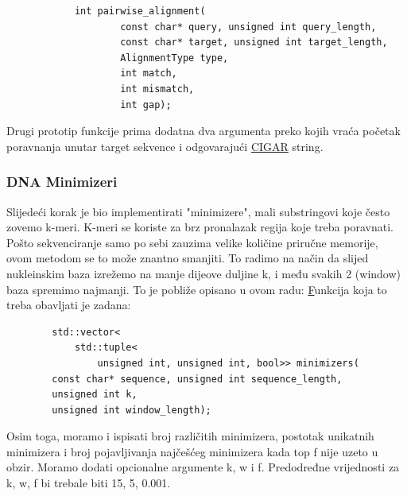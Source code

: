 \documentclass[times, 12pt, utf8]{article}
\begin{document}
            \begin{lstlisting}
            int pairwise_alignment(
                    const char* query, unsigned int query_length,
                    const char* target, unsigned int target_length, 
                    AlignmentType type,
                    int match,
                    int mismatch,
                    int gap);
            \end{lstlisting}

            Drugi prototip funkcije prima dodatna dva argumenta preko kojih
            vraća početak poravnanja unutar \colorbox{gray!30}{target}
            sekvence i odgovarajući \href {https://samtools.github.io/hts-specs/SAMv1.pdf}{CIGAR} string.

        \subsubsection{DNA Minimizeri}
        Slijedeći korak je bio implementirati "minimizere", mali substringovi koje često zovemo k-meri. K-meri se koriste za brz pronalazak regija koje treba poravnati. Pošto sekvenciranje samo po sebi zauzima velike količine priručne memorije, ovom metodom se to može znantno smanjiti. To radimo na način da slijed nukleinskim baza izrežemo na manje dijeove duljine k, i među svakih 2 (window) baza spremimo najmanji. To je pobliže opisano u ovom radu: \href{https://academic.oup.com/bioinformatics/article/20/18/3363/202143} Funkcija koja to treba obavljati je zadana:
	
        \begin{lstlisting}
        std::vector<
            std::tuple<
                unsigned int, unsigned int, bool>> minimizers(
        const char* sequence, unsigned int sequence_length,
        unsigned int k,
        unsigned int window_length);
        \end{lstlisting}
        
        Osim toga, moramo i ispisati broj različitih minimizera, postotak unikatnih minimizera i broj pojavljivanja najčešćeg minimizera kada top f nije uzeto u obzir. Moramo dodati opcionalne argumente \colorbox{gray!30}{k}, \colorbox{gray!30}{w} i \colorbox{gray!30}{f}. Predodređne vrijednosti za \colorbox{gray!30}{k, w, f} bi trebale biti \colorbox{gray!30}{15, 5, 0.001}.
\end{document}
